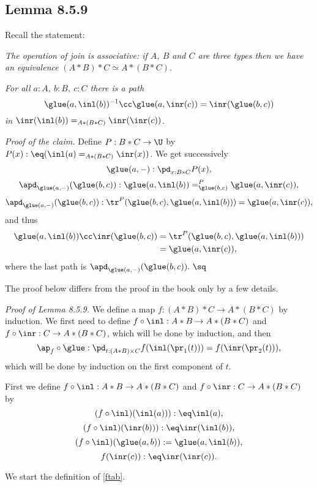 \documentclass[12pt]{article}
\begin{document}
\subsection{Lemma 8.5.9}%

Recall the statement:

\nn{} \emph{The operation of join is associative: if $A$, $B$ and $C$ are three types then we have an equivalence} $(A*B)*C\simeq A*(B*C)$.

\nn{} \emph{For all $a\!:\!A,\ b\!:\!B,\ c\!:\!C$ there is a path
$$
\glue(a,\inl(b))^{-1}\cc\glue(a,\inr(c))=\inr(\glue(b,c))
$$ 
in} $\inr(\inl(b))=_{A*(B*C)}\inr(\inr(c))$.

\nn\emph{Proof of the claim.} Define $P:B*C\to\U$ by $P(x):\eq(\inl(a)=_{A*(B*C)}\inr(x))$. We get successively 
$$
\glue(a,-):\pd_{x:B*C}P(x),
$$ 
$$
\apd_{\glue(a,-)}(\glue(b,c)):\glue(a,\inl(b))=^P_{\glue(b,c)}\glue(a,\inr(c)),
$$ 
$$
\apd_{\glue(a,-)}(\glue(b,c)):\tr^P(\glue(b,c),\glue(a,\inl(b)))=\glue(a,\inr(c)),
$$ 
and thus 
\begin{align*}
\glue(a,\inl(b))\cc\inr(\glue(b,c))&=\tr^P(\glue(b,c),\glue(a,\inl(b)))\\
&=\glue(a,\inr(c)),
\end{align*} 
where the last path is $\apd_{\glue(a,-)}(\glue(b,c)).\ \sq$

The proof below differs from the proof in the book only by a few details.

\nn\emph{Proof of Lemma 8.5.9.} We define a map $f:(A*B)*C\to A*(B*C)$ by induction. We first need to define $f\circ\inl:A*B\to A*(B*C)$ and $f\circ\inr:C\to A*(B*C)$, which will be done by induction, and then 
\begin{equation}\label{ftab}
\ap_f\circ\glue:\pd_{t:(A*B)\times C}f(\inl(\pr_1(t)))=f(\inr(\pr_2(t))),
\end{equation}  
which will be done by induction on the first component of $t$. 

First we define $f\circ\inl:A*B\to A*(B*C)$ and $f\circ\inr:C\to A*(B*C)$ by 
$$
(f\circ\inl)(\inl(a))):\eq\inl(a),
$$ 
$$
(f\circ\inl)(\inr(b))):\eq\inr(\inl(b)),
$$ 
\begin{equation}\label{fabbb}
(f\circ\inl)(\glue(a,b)):=\glue(a,\inl(b)),
\end{equation}
$$
f(\inr(c)):\eq\inr(\inr(c)).
$$

We start the definition of \eqref{ftab}. 
\end{document}
